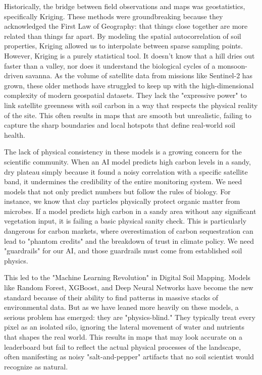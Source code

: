 \documentclass[conference]{IEEEtran}
\begin{document}
Historically, the bridge between field observations and maps was geostatistics, specifically Kriging. These methods were groundbreaking because they acknowledged the First Law of Geography: that things close together are more related than things far apart. By modeling the spatial autocorrelation of soil properties, Kriging allowed us to interpolate between sparse sampling points. However, Kriging is a purely statistical tool. It doesn't know that a hill dries out faster than a valley, nor does it understand the biological cycles of a monsoon-driven savanna. As the volume of satellite data from missions like Sentinel-2 has grown, these older methods have struggled to keep up with the high-dimensional complexity of modern geospatial datasets. They lack the "expressive power" to link satellite greenness with soil carbon in a way that respects the physical reality of the site. This often results in maps that are smooth but unrealistic, failing to capture the sharp boundaries and local hotspots that define real-world soil health.

The lack of physical consistency in these models is a growing concern for the scientific community. When an AI model predicts high carbon levels in a sandy, dry plateau simply because it found a noisy correlation with a specific satellite band, it undermines the credibility of the entire monitoring system. We need models that not only predict numbers but follow the rules of biology. For instance, we know that clay particles physically protect organic matter from microbes. If a model predicts high carbon in a sandy area without any significant vegetation input, it is failing a basic physical sanity check. This is particularly dangerous for carbon markets, where overestimation of carbon sequestration can lead to "phantom credits" and the breakdown of trust in climate policy. We need "guardrails" for our AI, and those guardrails must come from established soil physics.

This led to the "Machine Learning Revolution" in Digital Soil Mapping. Models like Random Forest, XGBoost, and Deep Neural Networks have become the new standard because of their ability to find patterns in massive stacks of environmental data. But as we have leaned more heavily on these models, a serious problem has emerged: they are "physics-blind." They typically treat every pixel as an isolated silo, ignoring the lateral movement of water and nutrients that shapes the real world. This results in maps that may look accurate on a leaderboard but fail to reflect the actual physical processes of the landscape, often manifesting as noisy "salt-and-pepper" artifacts that no soil scientist would recognize as natural.
\end{document}
